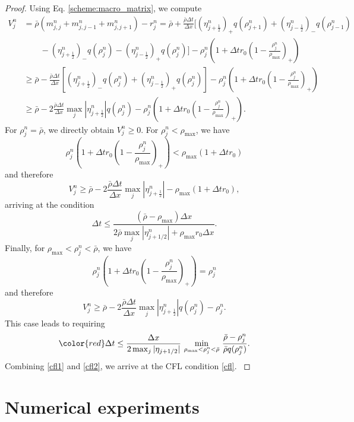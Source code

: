 \documentclass[review,onefignum,onetabnum]{siamart220329}
\begin{document}
\begin{proof}
{Using Eq. \eqref{scheme:macro_matrix}, we compute
\begin{equation*}
\begin{split}
    V^n_j &= \bar{\rho}(m_{j,j}^n + m_{j,j-1}^n + m_{j,j+1}^n) -r_j^n  = \bar{\rho} + \frac{\bar{\rho} \Delta t}{\Delta x} [(\eta_{j+\frac12}^n)_+ q(\rho_{j+1}^n) + (\eta_{j-\frac12}^n)_- q(\rho_{j-1}^n) \\ & \qquad - (\eta_{j+\frac12}^n)_- q(\rho_j^n) - (\eta_{j-\frac12}^n)_+ q(\rho_j^n) ] - \rho_j^n ( 1+ \Delta t r_0 ( 1 - \frac{\rho_j^n}{\rho_{\max}})_+) \\
    & \geq \bar{\rho} - \frac{\bar{\rho} \Delta t}{\Delta x} [ (\eta_{j+\frac12}^n)_- q(\rho_j^n) + (\eta_{j-\frac12}^n)_+ q(\rho_j^n) ] - \rho_j^n ( 1+ \Delta t r_0 ( 1 - \frac{\rho_j^n}{\rho_{\max}})_+)\\
    & \geq \bar{\rho} - 2\frac{\bar{\rho} \Delta t}{\Delta x} \max_j |\eta_{j+\frac12}^n| q(\rho_j^n) - \rho_j^n ( 1+ \Delta t r_0 ( 1 - \frac{\rho_j^n}{\rho_{\max}})_+).
\end{split}
\end{equation*}
\noindent For $\rho_j^n = \bar{\rho}$, we directly obtain $V_j^n \geq 0$. For $\rho_j^n <\rho_{\max}$, we have 
$$
\rho_j^n ( 1+ \Delta t r_0 ( 1 - \frac{\rho_j^n}{\rho_{\max}})_+) < \rho_{\max} (1+ \Delta t r_0)
$$
and therefore
$$
V_j^n \geq \bar{\rho} - 2\frac{\bar{\rho} \Delta t}{\Delta x} \max_j |\eta_{j+\frac12}^n| - \rho_{\max} (1+ \Delta t r_0), 
$$
arriving at the condition 
\begin{equation}\label{cfl1}
\Delta t \leq  \frac{(\bar{\rho} - \rho_{\max})\Delta x}{2 \bar{\rho} \max_j |\eta_{j+1/2}^n| + \rho_{\max} r_0 \Delta x}.
\end{equation}
Finally, for $\rho_{\max} < \rho_j^n < \bar{\rho}$, we have
$$
\rho_j^n ( 1+ \Delta t r_0 ( 1 - \frac{\rho_j^n}{\rho_{\max}})_+) = \rho_j^n 
$$
and therefore
$$
V_j^n \geq \bar{\rho} - 2\frac{\bar{\rho} \Delta t}{\Delta x} \max_j |\eta_{j+\frac12}^n|q(\rho_j^n) - \rho_j^n. 
$$
This case leads to requiring
\begin{equation}\label{cfl2}
{\color{red}\Delta t \leq \frac{\Delta x}{2 \max_j |\eta_{j+1/2}|}\ \underset{ \rho_{\max} < \rho_j^n < \bar{\rho}}{\min} \ \frac{\bar{\rho} - \rho_j^n}{\bar{\rho} q(\rho_j^n)}.}
\end{equation}
Combining \eqref{cfl1} and \eqref{cfl2}, we arrive at the CFL condition \eqref{cfl}.
}
\end{proof}


\section{Numerical experiments}\label{numerical results}
\end{document}
